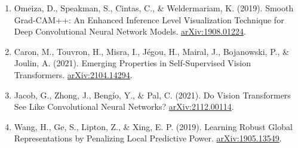 \documentclass[a4paper,12pt]{article}
\begin{document}
\begin{enumerate}
    \item Omeiza, D., Speakman, S., Cintas, C., \& Weldermariam, K. (2019). Smooth Grad-CAM++: An Enhanced Inference Level Visualization Technique for Deep Convolutional Neural Network Models. \href{https://arxiv.org/abs/1908.01224}{arXiv:1908.01224}.
    
    \item Caron, M., Touvron, H., Misra, I., Jégou, H., Mairal, J., Bojanowski, P., \& Joulin, A. (2021). Emerging Properties in Self-Supervised Vision Transformers. \href{https://arxiv.org/abs/2104.14294}{arXiv:2104.14294}.
    
    \item Jacob, G., Zhong, J., Bengío, Y., & Pal, C. (2021). Do Vision Transformers See Like Convolutional Neural Networks? \href{https://arxiv.org/abs/2112.00114}{arXiv:2112.00114}.
    
    \item Wang, H., Ge, S., Lipton, Z., & Xing, E. P. (2019). Learning Robust Global Representations by Penalizing Local Predictive Power. \href{https://arxiv.org/abs/1905.13549}{arXiv:1905.13549}.
\end{enumerate}





\end{document}
